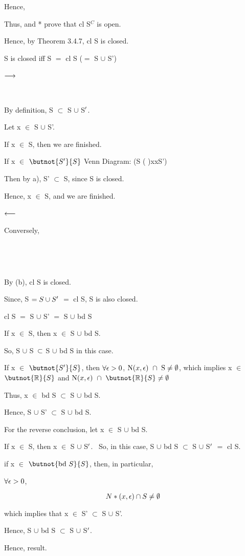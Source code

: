\documentclass{article}
\begin{document}
Hence, 

Thus,  and * prove that cl S$^C$ is open. \

Hence, by Theorem 3.4.7, cl S is closed.

 S is closed iff S $=$ cl S ($=$ S $\cup$ S') \

$\longrightarrow$ \


 \

By definition, S $\subset$ S $\cup$ S$^\prime$. \


Let x $\in$ S $\cup$ S'. \

If x $\in$ S, then we are finished. \

If x $\in$ $\butnot{S\pr}{S}$ Venn Diagram: (S     (    )xxS') \

Then by a), S' $\subset$ S, since S is closed.

Hence, x $\in$ S, and we are finished.\

$\longleftarrow$ \

Conversely, \

 \

\

By (b), cl S is closed. \

Since, S $= S \cup S^\prime$ $=$ cl S, S is also closed.



 cl S $=$ S $\cup$ S' $=$ S $\cup$ bd S \


If x $\in$ S, then x $\in$ S $\cup$ bd S.\

So, S $\cup$ S\ $\subset$ S $\cup$ bd S in this case. \

If x $\in$ $\butnot{S\pr}{S}$, then $\forall \epsilon > 0$, $\textrm{N(}x, \epsilon\textrm{) }\cap \textrm{ S} \neq \emptyset$, which implies x $\in$ $\butnot{\br}{S}$ and $\nbho{x}{\epsilon}{$\butnot{\br}{S}$}$ \

Thus, x $\in$ bd S $\subset$ S $\cup$ bd S. \

Hence, S $\cup$ S' $\subset$ S $\cup$ bd S. \

For the reverse conclusion, let x $\in$ S $\cup$ bd S. \

If x $\in$ S, then x $\in$ S $\cup$ S$^\prime$. \
So, in this case, S $\cup$ bd S $\subset$ S $\cup$ S$^\prime$ $=$ cl S. \

if x $\in$ $\butnot{\textrm{bd } S}{S}$, then, in particular, \

$\forall \epsilon > 0$,

\[N*(x, \epsilon) \cap S \neq \emptyset\]

which implies that x $\in$ S' $\subset$ S $\cup$ S'. \

Hence, S $\cup$ bd S $\subset$ S $\cup$ S$^\prime$. \

Hence, result.



\epf
\end{document}
